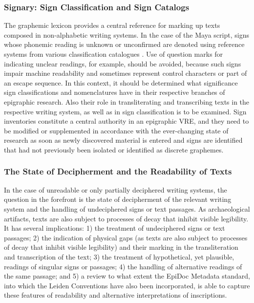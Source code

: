 \documentclass[amsthm,ebook]{saparticle}
\begin{document}
\subsubsection[Signary: Sign Classification and Sign Catalogs ]{Signary: Sign Classification and Sign Catalogs }
\noindent The graphemic lexicon provides a central reference for marking up texts composed in non-alphabetic writing systems. In
the case of the Maya script, signs whose phonemic reading is unknown or unconfirmed are denoted using reference systems
from various classification catalogues \citep[e.g.]{Thompson1962}. Use of question marks for indicating unclear readings, for
example, should be avoided, because such signs impair machine readability and sometimes represent control characters or
part of an escape sequence. In this context, it should be determined what significance sign classifications and
nomenclatures have in their respective branches of epigraphic research. Also their role in transliterating and
transcribing texts in the respective writing system, as well as in sign classification is to be examined. Sign
inventories constitute a central authority in an epigraphic VRE, and they need to be modified or supplemented in
accordance with the ever-changing state of research as soon as newly discovered material is entered and signs are
identified that had not previously been isolated or identified as discrete graphemes. 

\subsubsection[The State of Decipherment and the Readability of Texts ]{The State of Decipherment
and the Readability of Texts }
\noindent In the case of unreadable or only partially deciphered writing systems, the question in the forefront is the state of
decipherment of the relevant writing system and the handling of undeciphered signs or text passages. As archaeological
artifacts, texts are also subject to processes of decay that inhibit visible legibility. It has several implications:
1) the treatment of undeciphered signs or text passages; 2) the indication of physical gaps (as texts are also subject
to processes of decay that inhibit visible legibility) and their marking in the transliteration and transcription of
the text; 3) the treatment of hypothetical, yet plausible, readings of singular signs or passages; 4) the handling of
alternative readings of the same passage; and 5) a review to what extent the EpiDoc Metadata standard, into which the
Leiden Conventions have also been incorporated, is able to capture these features of readability and alternative
interpretations of inscriptions.
\end{document}
